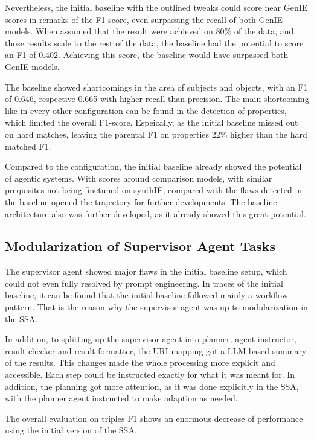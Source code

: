 \documentclass[a4paper,oneside,bibliography=totoc]{scrbook}
\begin{document}
Nevertheless, the initial baseline with the outlined tweaks could score near GenIE scores in remarks of the F1-score, even surpassing the recall of both GenIE models. When assumed that the result were achieved on 80\% of the data, and those results scale to the rest of the data, the baseline had the potential to score an F1 of 0.402. Achieving this score, the baseline would have surpassed both GenIE models.

The baseline showed shortcomings in the area of subjects and objects, with an F1 of 0.646, respective 0.665 with higher recall than precision. The main shortcoming like in every other configuration can be found in the detection of properties, which limited the overall F1-score. Espeically, as the initial baseline missed out on hard matches, leaving the parental F1 on properties 22\% higher than the hard matched F1.

Compared to the configuration, the initial baseline already showed the potential of agentic systems. With scores around comparison models, with similar prequisites not being finetuned on synthIE, compared with the flaws detected in the baseline opened the trajectory for further developments. The baseline architecture also was further developed, as it already showed this great potential.

\subsection{Modularization of Supervisor Agent Tasks}
\label{subsec:modularization_agent_tasks}

The supervisor agent showed major flaws in the initial baseline setup, which could not even fully resolved by prompt engineering. In traces of the initial baseline, it can be found that the initial baseline followed mainly a workflow pattern. That is the reason why the supervisor agent was up to modularization in the \ac{SSA}.

In addition, to splitting up the supervisor agent into planner, agent instructor, result checker and result formatter, the URI mapping got a \ac{LLM}-based summary of the results. This changes made the whole processing more explicit and accessible. Each step could be instructed exactly for what it was meant for. In addition, the planning got more attention, as it was done explicitly in the \ac{SSA}, with the planner agent instructed to make adaption as needed.

The overall evaluation on triples F1 shows an enormous decrease of performance using the initial version of the \ac{SSA}.
\end{document}
